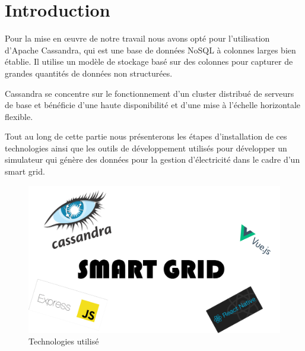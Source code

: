 \section*{Introduction}

Pour la mise en œuvre de notre travail nous avons opté pour l'utilisation d'Apache Cassandra, qui est une base de données NoSQL à colonnes larges bien établie. Il utilise un modèle de stockage basé sur des colonnes pour capturer de grandes quantités de données non structurées.

Cassandra se concentre sur le fonctionnement d'un cluster distribué de serveurs de base et bénéficie d'une haute disponibilité et d'une mise à l'échelle horizontale flexible.

Tout au long de cette partie nous présenterons les étapes d'installation de ces technologies ainsi que les outils de développement utilisés pour développer un simulateur qui génère des données pour la gestion d'électricité dans le cadre d'un smart grid.

\begin{figure}[h]
	\centering
    \includegraphics[scale=0.5]{img/part3/1.1}
    \caption{Technologies utilisé}
\end{figure}
